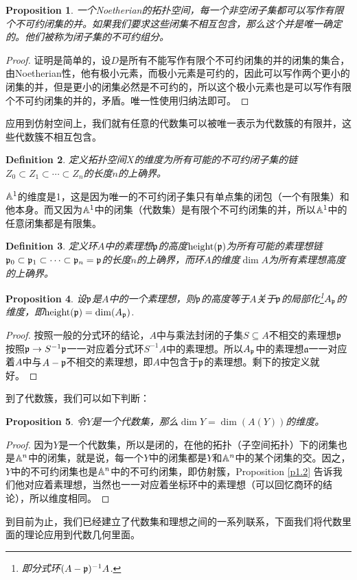 \documentclass[9pt]{extarticle}
\theoremstyle{plain}%
\newtheorem{defi}{Definition}[section]%
\newtheorem{pro}[defi]{Proposition}%
\begin{document}
\begin{pro}
	一个Noetherian的拓扑空间，每一个非空闭子集都可以写作有限个不可约闭集的并。如果我们要求这些闭集不相互包含，那么这个并是唯一确定的。他们被称为闭子集的不可约组分。
\end{pro}
\begin{proof}
证明是简单的，设$D$是所有不能写作有限个不可约闭集的并的闭集的集合，由Noetherian性，他有极小元素，而极小元素是可约的，因此可以写作两个更小的闭集的并，但是更小的闭集必然是不可约的，所以这个极小元素也是可以写作有限个不可约闭集的并的，矛盾。唯一性使用归纳法即可。
\end{proof}
应用到仿射空间上，我们就有任意的代数集可以被唯一表示为代数簇的有限并，这些代数簇不相互包含。

\begin{defi}
	定义拓扑空间$X$的维度为所有可能的不可约闭子集的链$Z_0\subset Z_1\subset \cdots \subset Z_n$的长度$n$的上确界。
\end{defi}

$\mathbb{A}^1$的维度是1，这是因为唯一的不可约闭子集只有单点集的闭包（一个有限集）和他本身。而又因为$\mathbb{A}^1$中的闭集（代数集）是有限个不可约闭集的并，所以$\mathbb{A}^1$中的任意闭集都是有限集。

\begin{defi}
定义环$A$中的素理想$\mathfrak{p}$的高度$\operatorname{height}(\mathfrak{p})$为所有可能的素理想链$\mathfrak{p}_0\subset \mathfrak{p}_1\subset \cdots \subset \mathfrak{p}_n=\mathfrak{p}$的长度$n$的上确界，而环$A$的维度$\dim A$为所有素理想高度的上确界。
\end{defi}
\begin{pro}
设$\mathfrak{p}$是$A$中的一个素理想，则$\mathfrak{p}$的高度等于$A$关于$\mathfrak{p}$的局部化\footnote{即分式环$(A-\mathfrak{p})^{-1}A$.}$A_{\mathfrak{p}}$的维度，即$\operatorname{height}(\mathfrak{p})=\dim (A_{\mathfrak{p}})$.
\end{pro}
\begin{proof}
按照一般的分式环的结论，$A$中与乘法封闭的子集$S\subseteq A$不相交的素理想$\mathfrak{p}$按照$\mathfrak{p} \to S^{-1}\mathfrak{p}$一一对应着分式环$S^{-1}A$中的素理想。所以$A_{\mathfrak{p}}$中的素理想$\mathfrak{a}$一一对应着$A$中与$A-\mathfrak{p}$不相交的素理想，即$A$中包含于$\mathfrak{p}$的素理想。剩下的按定义就好。
\end{proof}

到了代数簇，我们可以如下判断：

\begin{pro}令$Y$是一个代数集，那么$\dim Y=\dim (A(Y))$的维度。\end{pro}

\begin{proof}
因为$Y$是一个代数集，所以是闭的，在他的拓扑（子空间拓扑）下的闭集也是$\mathbb{A}^n$中的闭集，就是说，每一个$Y$中的闭集都是$Y$和$\mathbb{A}^n$中的某个闭集的交。因之，$Y$中的不可约闭集也是$\mathbb{A}^n$中的不可约闭集，即仿射簇，Proposition \ref{p1.2} 告诉我们他对应着素理想，当然也一一对应着坐标环中的素理想（可以回忆商环的结论），所以维度相同。
\end{proof}
到目前为止，我们已经建立了代数集和理想之间的一系列联系，下面我们将代数里面的理论应用到代数几何里面。
\end{document}
